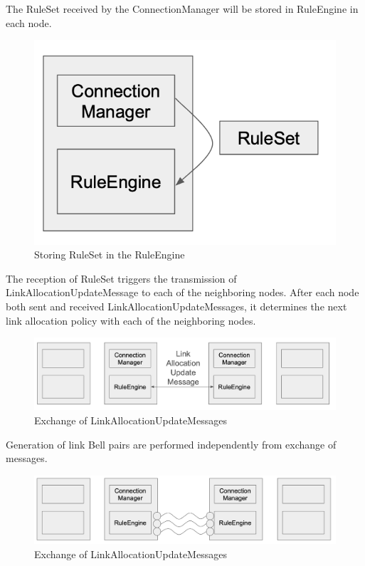 The RuleSet received by the ConnectionManager will be stored in RuleEngine in each node.
\begin{figure}[H]
  \centerline{\includegraphics[width=\columnwidth]{images/ruleset_in_rule_engine.png}}
  \caption{Storing RuleSet in the RuleEngine}
\end{figure}

The reception of RuleSet triggers the transmission of LinkAllocationUpdateMessage to each of the neighboring nodes.
After each node both sent and received LinkAllocationUpdateMessages, it determines the next link allocation policy with each of the neighboring nodes.
\begin{figure}[H]
  \centerline{\includegraphics[width=\columnwidth]{images/lau_negotiation.png}}
  \caption{Exchange of LinkAllocationUpdateMessages}
\end{figure}

Generation of link Bell pairs are performed independently from exchange of messages.
\begin{figure}[H]
  \centerline{\includegraphics[width=\columnwidth]{images/bell_pair_generation.png}}
  \caption{Exchange of LinkAllocationUpdateMessages}
\end{figure}

